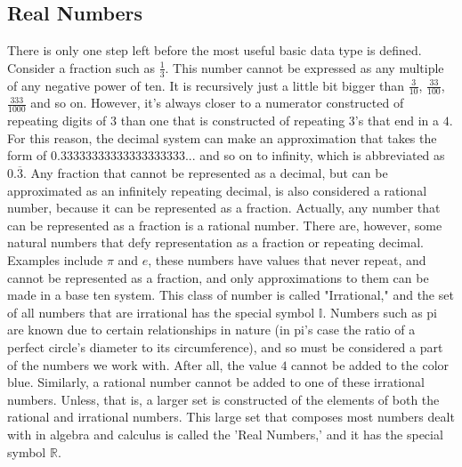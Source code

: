 \subsection{Real Numbers}
There is only one step left before the most useful basic data type is defined. Consider a fraction such as $\frac{1}{3}$. This number cannot be expressed as any multiple of any negative power of ten. It is recursively just a little bit bigger than $\frac{3}{10}$, $\frac{33}{100}$, $\frac{333}{1000}$ and so on. However, it's always closer to a numerator constructed of repeating digits of $3$ than one that is constructed of repeating $3$'s that end in a $4$. For this reason, the decimal system can make an approximation that takes the form of $0.33333333333333333333...$ and so on to infinity, which is abbreviated as $0.\overline{3}$. Any fraction that cannot be represented as a decimal, but can be approximated as an infinitely repeating decimal, is also considered a rational number, because it can be represented as a fraction. Actually, any number that can be represented as a fraction is a rational number. There are, however, some natural numbers that defy representation as a fraction or repeating decimal. Examples include $\pi$ and $e$, these numbers have values that never repeat, and cannot be represented as a fraction, and only approximations to them can be made in a base ten system. This class of number is called "Irrational," and the set of all numbers that are irrational has the special symbol $\mathbb{I}$. Numbers such as pi are known due to certain relationships in nature (in pi's case the ratio of a perfect circle's diameter to its circumference), and so must be considered a part of the numbers we work with. After all, the value $4$ cannot be added to the color blue. Similarly, a rational number cannot be added to one of these irrational numbers. Unless, that is, a larger set is constructed of the elements of both the rational and irrational numbers. This large set that composes most numbers dealt with in algebra and calculus is called the 'Real Numbers,' and it has the special symbol $\mathbb{R}$.























